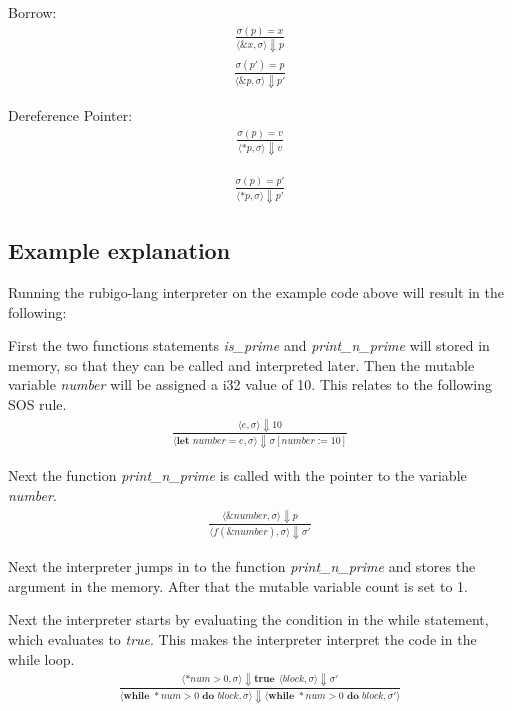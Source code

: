 \documentclass[12pt]{article}
\begin{document}
	Borrow:
	\begin{align*}
		\frac{\sigma(p) = x}
		{\langle \&x, \sigma \rangle\Downarrow p}
	\end{align*}
	\begin{align*}
		\frac{\sigma(p') = p}
		{\langle \&p, \sigma \rangle\Downarrow p'}
	\end{align*}

	Dereference Pointer:
	\begin{align*}
		\frac{\sigma(p) = v}
		{\langle *p, \sigma \rangle\Downarrow v}
	\end{align*}

	\begin{align*}
		\frac{\sigma(p) = p'}
		{\langle *p, \sigma \rangle\Downarrow p'}
	\end{align*}	


    \subsection{Example explanation}
	Running the rubigo-lang interpreter on the example code above will result in the following:

	First the two functions statements \emph{is\_prime} and \emph{print\_n\_prime} will stored in memory, so that they can be called and interpreted later. Then the mutable variable \emph{number} will be assigned a i32 value of 10. This relates to the following SOS rule.
	\begin{align*}
		\frac{\langle e, \sigma \rangle\Downarrow 10}
		{\langle  \textbf{let } number = e, \sigma \rangle\Downarrow \sigma [number := 10]}
	\end{align*}

	Next the function \emph{print\_n\_prime} is called with the pointer to the variable \emph{number}.
	\begin{align*}
		\frac{\langle \&number, \sigma \rangle\Downarrow p}
		{\langle f(\&number), \sigma \rangle\Downarrow \sigma'}
	\end{align*}

	Next the interpreter jumps in to the function \emph{print\_n\_prime} and stores the argument in the memory. After that the mutable variable count is set to 1.

	Next the interpreter starts by evaluating the condition in the while statement, which evaluates to \emph{true}. This makes the interpreter interpret the code in the while loop.
	\begin{align*}
		\frac{\langle *num > 0, \sigma \rangle\Downarrow \textbf{true} \ \
		\langle block, \sigma \rangle\Downarrow \sigma'}
		{\langle \textbf{while } *num > 0 \textbf{ do } block, \sigma \rangle\Downarrow \langle \textbf{while } *num > 0 \textbf{ do } block, \sigma' \rangle}
	\end{align*}
\end{document}
